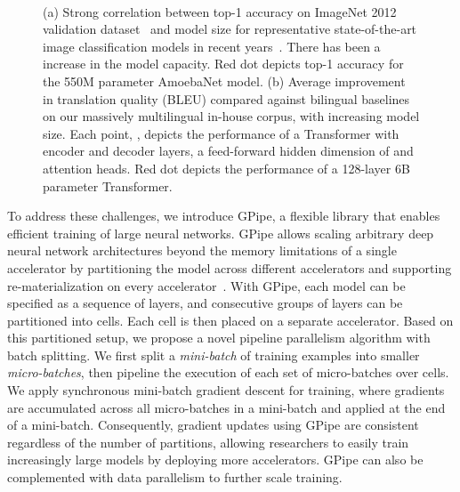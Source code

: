 \documentclass{article}
\def\codename{GPipe}
\begin{document}
\begin{figure}[!t]
\caption{(a) Strong correlation between top-1 accuracy on ImageNet 2012 validation dataset~\cite{deng2009imagenet} and model size for representative state-of-the-art image classification models in recent years~\cite{szegedy2015going, szegedy2016rethinking, he2016identity, xie2017aggregated, hu2017squeeze, zoph2017learning, real2018regularized}. There has been a  increase in the model capacity. Red dot depicts  top-1 accuracy for the 550M parameter AmoebaNet model. (b) Average improvement in translation quality (BLEU) compared against bilingual baselines on our massively multilingual in-house corpus, with increasing model size. Each point, , depicts the performance of a Transformer with  encoder and  decoder layers, a feed-forward hidden dimension of  and  attention heads. Red dot depicts the performance of a 128-layer 6B parameter Transformer.}
\label{fig_size_accuracy}
   \hspace{1mm}  \\
\end{figure}

To address these challenges, we introduce \codename{}, a flexible library that enables efficient training of large neural networks. \codename{} allows scaling arbitrary deep neural network architectures beyond the memory limitations of a single accelerator by partitioning the model across different accelerators and supporting re-materialization on every accelerator~\cite{griewank2000algorithm,chen2016training}.
With \codename{}, each model can be specified as a sequence of layers, and consecutive groups of layers can be partitioned into cells. Each cell is then placed on a separate accelerator. Based on this partitioned setup, we propose a novel pipeline parallelism algorithm with batch splitting. We first split a \textit{mini-batch} of training examples into smaller \textit{micro-batches}, then pipeline the execution of each set of micro-batches over cells. We apply synchronous mini-batch gradient descent for training, where gradients are accumulated across all micro-batches in a mini-batch and applied at the end of a mini-batch. Consequently, gradient updates using \codename{} are consistent regardless of the number of partitions, allowing researchers to easily train increasingly large models by deploying more accelerators. \codename{} can also be complemented with data parallelism to further scale training.
\end{document}
